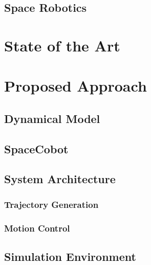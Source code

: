 \documentclass[a4paper, oneside]{article}
\begin{document}
    \subsection{Space Robotics}
    \label{sec:Background:Space Robots}
    

\section{State of the Art}
    \label{sec:State of the Art:Payload Transportation}
    

\section{Proposed Approach}
    \subsection{Dynamical Model}
    \label{sec:Proposed Approach:Motion Model}
    

    \subsection{SpaceCobot}
    \label{sec:Proposed Approach: Space Cobot}
    

    \subsection{System Architecture}
    \label{sec:Proposed Approach:System Architecture}
    

    \subsubsection{Trajectory Generation}
    \label{sec:Proposed Approach:Reference Trajectory}
    

    \subsubsection{Motion Control}
    \label{sec:Proposed Approach:Controler}
    

    \subsection{Simulation Environment}
    \label{sec:Proposed Approach:Simulator}
    
\end{document}
